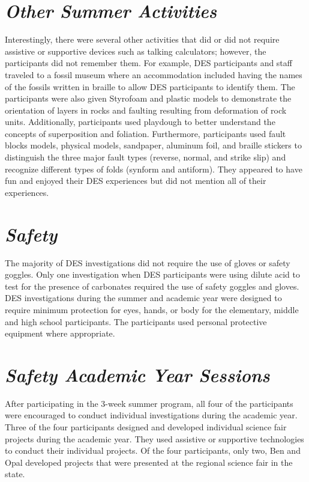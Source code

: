 \documentclass[11.5pt]{sig-alternate}
\begin{document}
\begin{large}
\section*{\textit{Other Summer Activities}}
Interestingly, there were several other activities that did or did not require assistive or supportive devices such as talking calculators; however, the participants did not remember them. For example, DES participants and staff traveled to a fossil museum where an accommodation included having the names of the fossils written in braille to allow DES participants to identify them.  The participants were also given Styrofoam and plastic models to demonstrate the orientation of layers in rocks and faulting resulting from deformation of rock units. Additionally, participants used playdough to better understand the concepts of superposition and foliation. Furthermore, participants used fault blocks models, physical models, sandpaper, aluminum foil, and braille stickers to distinguish the three major fault types (reverse, normal, and strike slip) and recognize different types of folds (synform and antiform).  They appeared to have fun and enjoyed their DES experiences but did not mention all of their experiences.

\section*{\textit{Safety}}
The majority of DES investigations did not require the use of gloves or safety goggles. Only one investigation when DES participants were using dilute acid to test for the presence of carbonates required the use of safety goggles and gloves. DES investigations during the summer and academic year were designed to require minimum protection for eyes, hands, or body for the elementary, middle and high school participants. The participants used personal protective equipment where appropriate. 

\section*{\textit{Safety Academic Year Sessions}}
After participating in the 3-week summer program, all four of the participants were encouraged to conduct individual investigations during the academic year. Three of the four participants designed and developed individual science fair projects during the academic year. They used assistive or supportive technologies to conduct their individual projects. Of the four participants, only two, Ben and Opal developed projects that were presented at the regional science fair in the state.  


\end{large}
\end{document}
